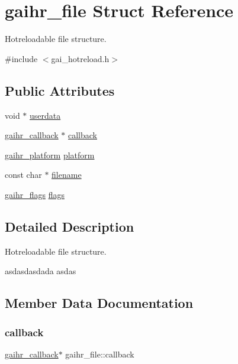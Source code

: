 \hypertarget{structgaihr__file}{}\section{gaihr\+\_\+file Struct Reference}
\label{structgaihr__file}


Hotreloadable file structure.  




{\ttfamily \#include $<$gai\+\_\+hotreload.\+h$>$}

\subsection*{Public Attributes}
\begin{DoxyCompactItemize}
\item 
void $\ast$ \hyperlink{structgaihr__file_a06bf963cb9c08e69fcc6c4bb3140a2b8}{userdata}
\item 
\hyperlink{gai__hotreload_8h_a57193639c716f099e0300ccec1e13131}{gaihr\+\_\+callback} $\ast$ \hyperlink{structgaihr__file_a9ac45c0142ff1eaf591b870e163d7f31}{callback}
\item 
\hyperlink{structgaihr__platform}{gaihr\+\_\+platform} \hyperlink{structgaihr__file_a138044c270d5f0e83917ae2841efe8b7}{platform}
\item 
const char $\ast$ \hyperlink{structgaihr__file_a26ea2bbf62231c3cae2317ca217f8166}{filename}
\item 
\hyperlink{gai__hotreload_8h_aaebb069b6896f065efd75640e0e4150b}{gaihr\+\_\+flags} \hyperlink{structgaihr__file_ab6eef82d50a8a51d161de3ab7ad98ee9}{flags}
\end{DoxyCompactItemize}


\subsection{Detailed Description}
Hotreloadable file structure. 

asdasdasdada asdas 

\subsection{Member Data Documentation}
\mbox{\label{structgaihr__file_a9ac45c0142ff1eaf591b870e163d7f31}} 
\subsubsection{\texorpdfstring{callback}{callback}}
{\footnotesize\ttfamily \hyperlink{gai__hotreload_8h_a57193639c716f099e0300ccec1e13131}{gaihr\+\_\+callback}$\ast$ gaihr\+\_\+file\+::callback}


